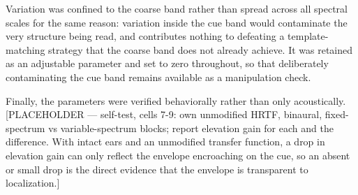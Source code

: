Variation was confined to the coarse band rather than spread across all
spectral scales for the same reason: variation inside the cue band would
contaminate the very structure being read, and contributes nothing to defeating
a template-matching strategy that the coarse band does not already achieve. It
was retained as an adjustable parameter and set to zero throughout, so that
deliberately contaminating the cue band remains available as a manipulation
check.

Finally, the parameters were verified behaviorally rather than only
acoustically. [PLACEHOLDER — self-test, cells 7-9: own unmodified HRTF,
binaural, fixed-spectrum vs variable-spectrum blocks; report elevation gain for
each and the difference. With intact ears and an unmodified transfer function,
a drop in elevation gain can only reflect the envelope encroaching on the cue,
so an absent or small drop is the direct evidence that the envelope is
transparent to localization.]


